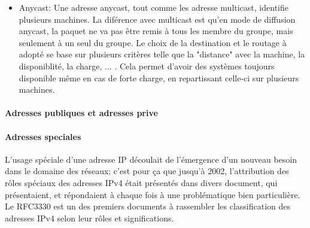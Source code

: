 \begin{itemize}
plusieurs machines simplement, une adresse peut être utilisé depuis cette plage.
Elle s'étend de l'adresse 224.0.0.0 à l'adresse 239.255.255.255 et à pour masque 240.0.0.0 . Cela laisse donc 2\^28 adresses
multicast différente.
Au sein de cette plage d'adresse il existe une catégorisation:
//TODO
\begin{itemize}
\item
\end{itemize}
Ce mode permet de limiter le nombre de paquet envoyé pour joindre plusieurs machine et il est très utilisé dans le cas
de diffusion en streaming ou de videoconférence, où il faut faire pervenir une même information à plusieurs autres
participants.
\item Anycast: Une adresse anycast, tout comme les adresse multicast, identifie plusieurs machines. La diférence avec multicast
est qu'en mode de diffusion anycast, la paquet ne va pas être remis à tous les membre du groupe, mais seulement à un seul du groupe.
Le choix de la destination et le routage à adopté se base sur plusieurs critères telle que la "distance" avec la machine, la disponiblité,
la charge, ... . Cela permet d'avoir des systèmes toujours disponible même en cas de forte charge, en repartissant celle-ci sur
plusieurs machines.
\end{itemize}




\paragraph{Adresses publiques et adresses prive}


\paragraph{Adresses speciales}
L'usage spéciale d'une adresse IP découlait de l'émergence
d'un nouveau besoin dans le domaine des réseaux; c'est pour
ça que jusqu'à 2002, l'attribution des rôles spéciaux des adresses
IPv4 était présentés dans divers document, qui présentaient, et répondaient à chaque fois à une
problématique bien particulière. Le RFC3330 est un des premiers documents à
rassembler les classification des adresses IPv4 selon leur rôles et significations.



